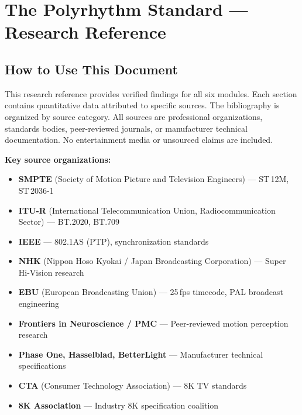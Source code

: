 \documentclass[11pt,letterpaper]{article}
\newcommand{\stageheader}[2]{%
  \noindent\colorbox{#2}{\makebox[\textwidth][l]{%
    \textcolor{white}{\bfseries\sffamily\hspace{6pt}#1\hspace{6pt}}}}%
  \vspace{0.5em}\par%
}
\begin{document}
\newpage

\stageheader{STAGE 2 --- RESEARCH REFERENCE}{secondary}

\section{The Polyrhythm Standard --- Research Reference}

\subsection{How to Use This Document}

This research reference provides verified findings for all six modules. Each section contains
quantitative data attributed to specific sources. The bibliography is organized by source category.
All sources are professional organizations, standards bodies, peer-reviewed journals, or manufacturer
technical documentation. No entertainment media or unsourced claims are included.

\textbf{Key source organizations:}
\begin{itemize}[leftmargin=*]
  \item \textbf{SMPTE} (Society of Motion Picture and Television Engineers) --- ST\,12M, ST\,2036-1
  \item \textbf{ITU-R} (International Telecommunication Union, Radiocommunication Sector) --- BT.2020, BT.709
  \item \textbf{IEEE} --- 802.1AS (PTP), synchronization standards
  \item \textbf{NHK} (Nippon Hoso Kyokai / Japan Broadcasting Corporation) --- Super Hi-Vision research
  \item \textbf{EBU} (European Broadcasting Union) --- 25\,fps timecode, PAL broadcast engineering
  \item \textbf{Frontiers in Neuroscience / PMC} --- Peer-reviewed motion perception research
  \item \textbf{Phase One, Hasselblad, BetterLight} --- Manufacturer technical specifications
  \item \textbf{CTA} (Consumer Technology Association) --- 8K TV standards
  \item \textbf{8K Association} --- Industry 8K specification coalition
\end{itemize}
\end{document}
